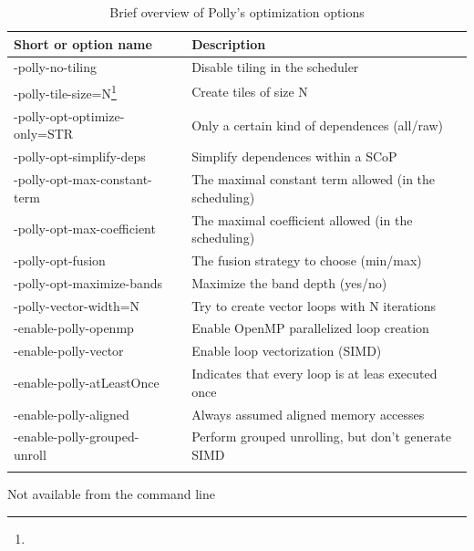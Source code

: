 \begin{table}[htbp]
  \caption{Brief overview of Polly's optimization options}
  \begin{tabularx}{\textwidth}{ l p{1mm} X}
    Short or option name          && Description \\
    \hline
    -polly-no-tiling              && Disable tiling in the scheduler  \\
    -polly-tile-size=N\footnote{} && Create tiles of size N \\
    -polly-opt-optimize-only=STR  && Only a certain kind of dependences (all/raw) \\
    -polly-opt-simplify-deps      && Simplify dependences within a SCoP    \\
    -polly-opt-max-constant-term  && The maximal constant term allowed (in the scheduling) \\
    -polly-opt-max-coefficient    && The maximal coefficient allowed (in the scheduling)  \\
    -polly-opt-fusion             && The fusion strategy to choose (min/max) \\
    -polly-opt-maximize-bands     && Maximize the band depth (yes/no) \\
    -polly-vector-width=N\footnotemark[1]  && Try to create vector loops with N iterations \\
    -enable-polly-openmp          && Enable OpenMP parallelized loop creation \\
    -enable-polly-vector          && Enable loop vectorization (SIMD) \\
    -enable-polly-atLeastOnce     && Indicates that every loop is at leas executed once \\
    -enable-polly-aligned         && Always assumed aligned memory accesses \\
    -enable-polly-grouped-unroll  && Perform grouped unrolling, but don't generate SIMD \\
     &&  \\ 
  \end{tabularx}
  \label{tab:PollyOptions}
  \footnotemark[1] Not available from the command line \\
\end{table}


